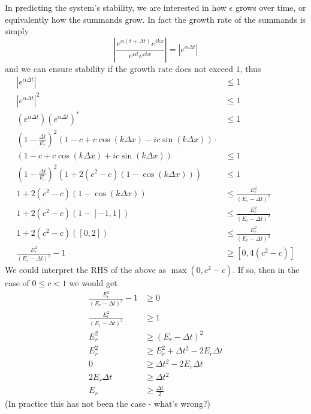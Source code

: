 \documentclass[11pt]{article}
\begin{document}
In predicting the system's stability, we are interested in how $\epsilon$ grows over time, or equivalently how the summands grow. In fact the growth rate of the summands is simply
\[
\left|\frac{e^{\alpha\left(t+\Delta t\right)}e^{ikx}}{e^{\alpha t}e^{ikx}}\right| = \left|e^{\alpha\Delta t}\right|
\]
and we can ensure stability if the growth rate does not exceed $1$, thus
\begin{align*}
\left|e^{\alpha\Delta t}\right|&\leq 1 \\
\left|e^{\alpha\Delta t}\right|^2&\leq 1 \\
\left(e^{\alpha\Delta t}\right)\left(e^{\alpha\Delta t}\right)^*&\leq 1 \\
\left(1-\frac{\Delta t}{E_r}\right)^2
\left(1-c+c\cos\left(k\Delta x\right)-ic\sin\left(k\Delta x\right)\right) \cdot \\
\left(1-c+c\cos\left(k\Delta x\right)+ic\sin\left(k\Delta x\right)\right)&\leq 1 \\
\left(1-\frac{\Delta t}{E_r}\right)^2\left(1+2(c^2-c)(1-\cos(k\Delta x))\right) &\leq 1 \\
1+2(c^2-c)(1-\cos(k\Delta x)) &\leq \frac{E_r^2}{\left(E_r-\Delta t\right)^2}	\tag{$\forall k$} \\
1+2(c^2-c)(1-[-1,1]) &\leq \frac{E_r^2}{\left(E_r-\Delta t\right)^2} \\
1+2(c^2-c)([0,2]) &\leq \frac{E_r^2}{\left(E_r-\Delta t\right)^2} \\
\frac{E_r^2}{\left(E_r-\Delta t\right)^2}-1 &\geq \left[0,4(c^2-c)\right]		\tag{for all values in range}
\end{align*}
We could interpret the RHS of the above as $\max\left(0,c^2-c\right)$. If so, then in the case of $0\leq c<1$ we would get
\begin{align*}
\frac{E_r^2}{\left(E_r-\Delta t\right)^2} -1 &\geq 0 \\
\frac{E_r^2}{\left(E_r-\Delta t\right)^2} &\geq 1 \\
E_r^2 &\geq \left(E_r-\Delta t\right)^2 \\
E_r^2 &\geq E_r^2 + \Delta t^2 -2E_r\Delta t \\
0 &\geq \Delta t^2 -2E_r\Delta t \\
2E_r\Delta t &\geq \Delta t^2 \\
E_r &\geq \frac{\Delta t}{2}
\end{align*}
(In practice this has not been the case - what's wrong?)
\end{document}
